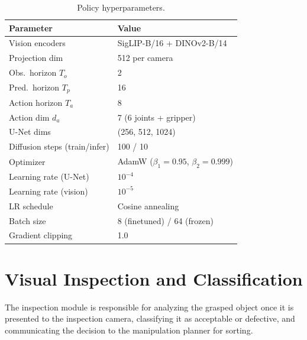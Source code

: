 \documentclass[conference]{IEEEtran}
\begin{document}
\begin{table}[t]
\centering
\caption{Policy hyperparameters.}
\label{tab:hyperparams}
\begin{tabular}{@{}ll@{}}
\toprule
\textbf{Parameter} & \textbf{Value} \\
\midrule
Vision encoders        & SigLIP-B/16 + DINOv2-B/14 \\
Projection dim         & 512 per camera \\
Obs.\ horizon $T_o$   & 2 \\
Pred.\ horizon $T_p$  & 16 \\
Action horizon $T_a$   & 8 \\
Action dim $d_a$       & 7 (6 joints + gripper) \\
U-Net dims             & (256, 512, 1024) \\
Diffusion steps (train/infer) & 100 / 10 \\
Optimizer              & AdamW ($\beta_1\!=\!0.95$, $\beta_2\!=\!0.999$) \\
Learning rate (U-Net)  & $10^{-4}$ \\
Learning rate (vision) & $10^{-5}$ \\
LR schedule            & Cosine annealing \\
Batch size             & 8 (finetuned) / 64 (frozen) \\
Gradient clipping      & 1.0 \\
\bottomrule
\end{tabular}
\end{table}

\section{Visual Inspection and Classification}
\label{sec:inspection}

The inspection module is responsible for analyzing the grasped object once it is presented to the inspection camera, classifying it as acceptable or defective, and communicating the decision to the manipulation planner for sorting.
\end{document}
